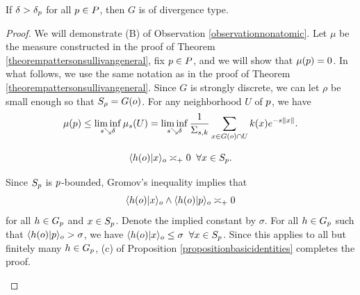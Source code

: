 \begin{theorem}
\label{theoremGFdivergencetype}
If $\delta > \delta_p$ for all $p\in P$, then $G$ is of divergence type.
\end{theorem}
\begin{proof}
We will demonstrate (B) of Observation \ref{observationnonatomic}. Let $\mu$ be the measure constructed in the proof of Theorem \ref{theorempattersonsullivangeneral}, fix $p\in P$, and we will show that $\mu(p) = 0$. In what follows, we use the same notation as in the proof of Theorem \ref{theorempattersonsullivangeneral}. Since $G$ is strongly discrete, we can let $\rho$ be small enough so that $S_\rho = G(o)$. For any neighborhood $U$ of $p$, we have
\begin{equation}
\label{pattersonsullivanbound}
\mu(p) \leq \liminf_{s\searrow\delta} \mu_s(U)
= \liminf_{s\searrow\delta} \frac{1}{\Sigma_{s,k}} \sum_{x\in G(o)\cap U} k(x) e^{-s\|x\|}.
\end{equation}

\begin{lemma}
\label{lemmaSbpasymp}
\[
\langle h(o) | x\rangle_o \asymp_+ 0 \;\;\forall x\in S_p.
\]
\end{lemma}
\begin{subproof}
Since $S_p$ is $p$-bounded, Gromov's inequality implies that
\[
\langle h(o) | x\rangle_o \wedge \langle h(o)|p\rangle_o \asymp_+ 0
\]
for all $h\in G_p$ and $x\in S_p$. Denote the implied constant by $\sigma$. For all $h\in G_p$ such that $\langle h(o)|p\rangle_o > \sigma$, we have $\langle h(o) | x\rangle_o \leq \sigma \;\;\forall x\in S_p$. Since this applies to all but finitely many $h\in G_p$, (c) of Proposition \ref{propositionbasicidentities} completes the proof.
\end{subproof}


\end{proof}
